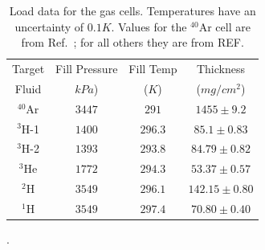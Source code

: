 \documentclass[final,5p,times,twocolumn]{elsarticle}
\begin{document}
\begin{table}[!h]
\centering
\begin{adjustbox}{width=0.5\textwidth}
\begin{tabular}{|c|c|c|c|}
	\hline 
	Target       & Fill Pressure & Fill Temp    & Thickness \\
	Fluid  		 &	$kPa$)		 &	($K$) 	    & ($mg/cm^2$) \\
	\hline 
	$^{40}$Ar	 & $3447$ 		 & $291$	    &  $1455\pm9.2$ \\ 
	\hline 
	$^{3}$H-1 	 & $1400$		 & $296.3$	    &  $85.1\pm 0.83$ \\ 
	\hline 
	$^{3}$H-2	 & $1393$		 & $293.8$		&  $84.79\pm0.82$ \\
	\hline
	$^{3}$He	 & $1772$		 & $294.3$	    &  $53.37\pm0.57$ \\ 
	\hline 
	$^{2}$H 	 & $3549$		 & $296.1$	    &  $142.15\pm0.80$ \\ 
	\hline 
	$^{1}$H 	 & $3549$		 & $297.4$	    &  $70.80\pm0.40$ \\ 
	\hline 
\end{tabular}
\end{adjustbox}
\caption{Load data for the gas cells. Temperatures have an uncertainty of $0.1K$. Values for the $^{40}$Ar cell are from Ref.~\cite{ar_config}; for all others they are from REF\cite{cellconfig}. }.
\label{tab:fill_tar}
\end{table}
\end{document}
